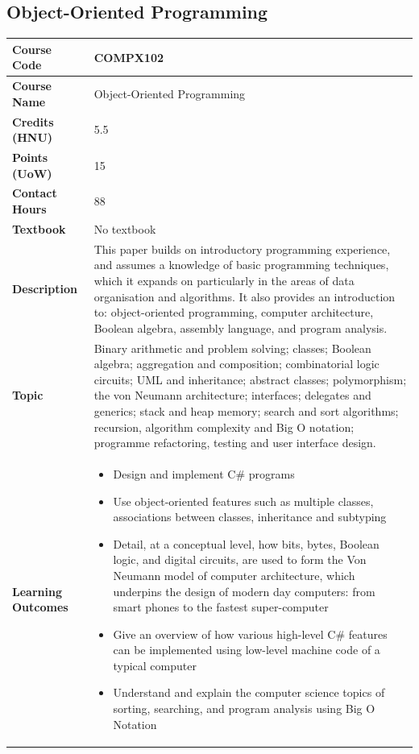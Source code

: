 \documentclass{article}
\begin{document}
\subsection[COMPX102 Object-Oriented Programming]{Object-Oriented Programming}
\renewcommand{\arraystretch}{1.5} %
\begin{longtable}{|p{3cm}|p{10cm}|}
\hline
\textbf{Course Code} & COMPX102 \\
\hline
\textbf{Course Name} & Object-Oriented Programming \\
\hline
\textbf{Credits (HNU)} & 5.5 \\
\hline
\textbf{Points (UoW)} & 15 \\
\hline
\textbf{Contact Hours} & 88 \\
\hline
\textbf{Textbook} & No textbook \\
\hline
\textbf{Description} & This paper builds on introductory programming experience, and assumes a knowledge of basic programming techniques, which it expands on particularly in the areas of data organisation and algorithms. It also provides an introduction to: object-oriented programming, computer architecture, Boolean algebra, assembly language, and program analysis.\\
\hline
\textbf{Topic} & Binary arithmetic and problem solving; classes; Boolean algebra; aggregation and composition; combinatorial logic circuits; UML and inheritance; abstract classes; polymorphism; the von Neumann architecture; interfaces; delegates and generics; stack and heap memory; search and sort algorithms; recursion, algorithm complexity and Big O notation; programme refactoring, testing and user interface design. \\
\hline
\textbf{Learning Outcomes} & 
    \begin{itemize}
        \item Design and implement C\# programs
        \item Use object-oriented features such as multiple classes, associations between classes, inheritance and subtyping
        \item Detail, at a conceptual level, how bits, bytes, Boolean logic, and digital circuits, are used to form the Von Neumann model of computer architecture, which underpins the design of modern day computers: from smart phones to the fastest super-computer
        \item Give an overview of how various high-level C\# features can be implemented using low-level machine code of a typical computer
        \item Understand and explain the computer science topics of sorting, searching, and program analysis using Big O Notation
    \end{itemize} \\
\hline
\end{longtable}
\end{document}
